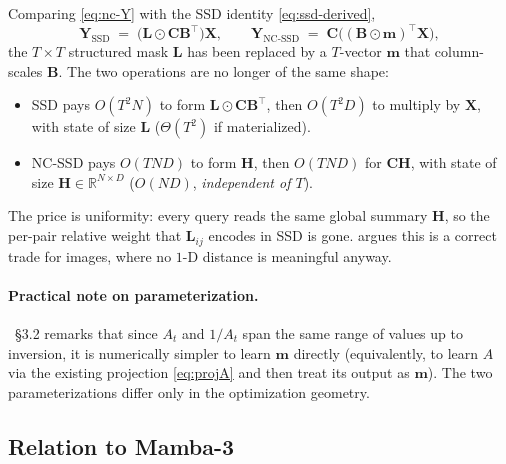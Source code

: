 \documentclass[11pt,a4paper]{article}
\begin{document}
Comparing \eqref{eq:nc-Y} with the SSD identity
\eqref{eq:ssd-derived},
\begin{equation}
  \bm{Y}_{\text{SSD}} \;=\; \bigl(\bm{L}\odot\bm{C}\bm{B}^\top\bigr)\bm{X},
  \qquad
  \bm{Y}_{\text{NC-SSD}} \;=\; \bm{C}\bigl((\bm{B}\odot\bm{m})^\top\bm{X}\bigr),
\end{equation}
the $T\times T$ structured mask $\bm{L}$ has been replaced by a
$T$-vector $\bm{m}$ that column-scales $\bm{B}$. The two operations
are no longer of the same shape:
\begin{itemize}
  \item SSD pays $O(T^2 N)$ to form $\bm{L}\odot\bm{C}\bm{B}^\top$,
        then $O(T^2 D)$ to multiply by $\bm{X}$, with state of size
        $\bm{L}$ ($\Theta(T^2)$ if materialized).
  \item NC-SSD pays $O(TND)$ to form $\bm{H}$, then $O(TND)$ for
        $\bm{C}\bm{H}$, with state of size $\bm{H}\in\mathbb{R}^{N\times D}$
        ($O(ND)$, \emph{independent of $T$}).
\end{itemize}
The price is uniformity: every query reads the same global summary
$\bm{H}$, so the per-pair relative weight that $\bm{L}_{ij}$ encodes
in SSD is gone. \cite{vssd} argues this is a correct trade for
images, where no $1$-D distance is meaningful anyway.

\paragraph{Practical note on parameterization.} \cite{vssd}~\S 3.2
remarks that since $A_t$ and $1/A_t$ span the same range of values up
to inversion, it is numerically simpler to learn $\bm{m}$ directly
(equivalently, to learn $A$ via the existing projection
\eqref{eq:projA} and then treat its output as $\bm{m}$). The two
parameterizations differ only in the optimization geometry.

\subsection{Relation to Mamba-3}\label{sec:ncssd-mamba3}
\end{document}
